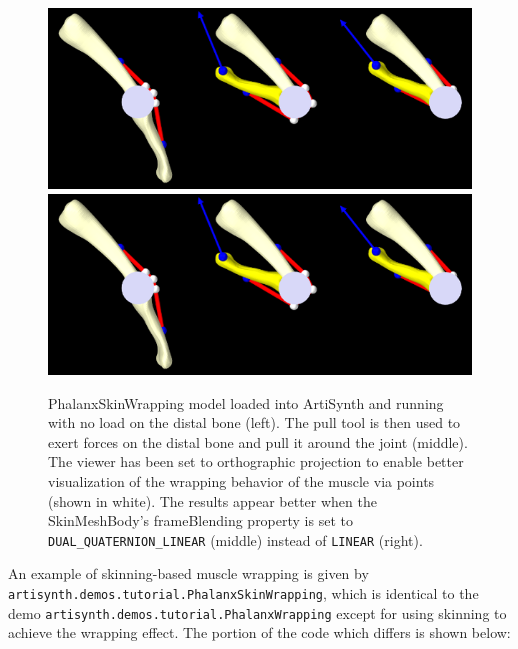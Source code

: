\begin{figure}[t]
\begin{center}
\iflatexml
 \includegraphics[]{images/PhalanxSkinWrapping}
\else
 \includegraphics[width=6in]{images/PhalanxSkinWrapping}
\fi
\end{center}
\caption{PhalanxSkinWrapping model loaded into ArtiSynth and running
with no load on the distal bone (left). The pull tool is then
used to exert forces on the distal bone and pull it around the joint
(middle).  The viewer has been set to {\sf orthographic} projection to
enable better visualization of the wrapping behavior of the muscle via
points (shown in white). The results appear better when the
SkinMeshBody's {\sf frameBlending} property is set to {\tt
DUAL\_QUATERNION\_LINEAR} (middle) instead of {\tt LINEAR} (right).}
\label{PhalanxSkinWrapping:fig}
\end{figure}

An example of skinning-based muscle wrapping is given by {\tt
artisynth.demos.tutorial.PhalanxSkinWrapping}, which is identical to
the demo {\tt artisynth.demos.tutorial.PhalanxWrapping} except for
using skinning to achieve the wrapping effect. The portion of the
code which differs is shown below: \lstset{numbers=left} \iflatexml

\else

\fi
\lstset{numbers=none}

